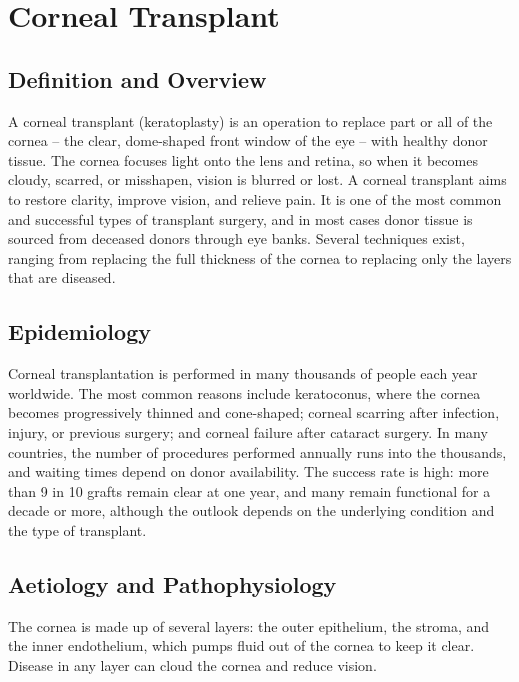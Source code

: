 \chapter{Corneal Transplant}

\section*{Definition and Overview}
A corneal transplant (keratoplasty) is an operation to replace part or all of the cornea -- the clear, dome-shaped front window of the eye -- with healthy donor tissue. The cornea focuses light onto the lens and retina, so when it becomes cloudy, scarred, or misshapen, vision is blurred or lost. A corneal transplant aims to restore clarity, improve vision, and relieve pain. It is one of the most common and successful types of transplant surgery, and in most cases donor tissue is sourced from deceased donors through eye banks. Several techniques exist, ranging from replacing the full thickness of the cornea to replacing only the layers that are diseased.

\section*{Epidemiology}
Corneal transplantation is performed in many thousands of people each year worldwide. The most common reasons include keratoconus, where the cornea becomes progressively thinned and cone-shaped; corneal scarring after infection, injury, or previous surgery; and corneal failure after cataract surgery. In many countries, the number of procedures performed annually runs into the thousands, and waiting times depend on donor availability. The success rate is high: more than 9 in 10 grafts remain clear at one year, and many remain functional for a decade or more, although the outlook depends on the underlying condition and the type of transplant.

\section*{Aetiology and Pathophysiology}
The cornea is made up of several layers: the outer epithelium, the stroma, and the inner endothelium, which pumps fluid out of the cornea to keep it clear. Disease in any layer can cloud the cornea and reduce vision.

